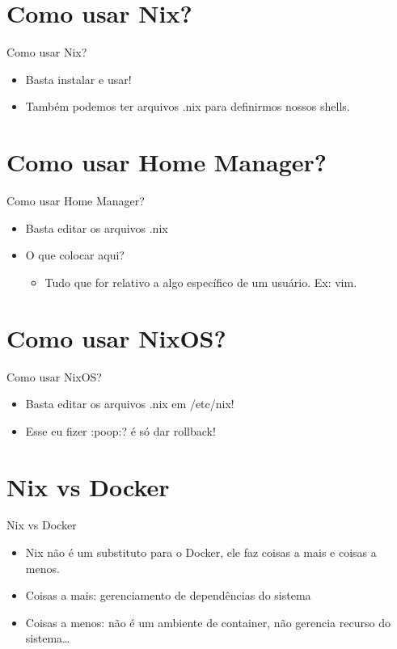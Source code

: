 \documentclass[presentation]{beamer}
\begin{document}
\section{Como usar Nix?}
\label{sec:orga8abfea}
\begin{frame}[label={sec:org5e4da66}]{Como usar Nix?}
\begin{itemize}
\item Basta instalar e usar!
\item Também podemos ter arquivos .nix para definirmos nossos shells.
\end{itemize}
\end{frame}

\section{Como usar Home Manager?}
\label{sec:org541084d}

\begin{frame}[label={sec:orgd46e7b7}]{Como usar Home Manager?}
\begin{itemize}
\item Basta editar os arquivos .nix
\item O que colocar aqui?
\begin{itemize}
\item Tudo que for relativo a algo específico de um usuário. Ex: vim.
\end{itemize}
\end{itemize}
\end{frame}

\section{Como usar NixOS?}
\label{sec:orgf8a0c0e}

\begin{frame}[label={sec:orgad9c757}]{Como usar NixOS?}
\begin{itemize}
\item Basta editar os arquivos .nix em /etc/nix!
\item Esse eu fizer :poop:? é só dar rollback!
\end{itemize}
\end{frame}

\section{Nix vs Docker}
\label{sec:org577b73e}
\begin{frame}[label={sec:org19e1682}]{Nix vs Docker}
\begin{itemize}
\item Nix não é um substituto para o Docker, ele faz coisas a mais e coisas a menos.
\item Coisas a mais: gerenciamento de dependências do sistema
\item Coisas a menos: não é um ambiente de container, não gerencia recurso do sistema\ldots{}
\end{itemize}
\end{frame}
\end{document}
